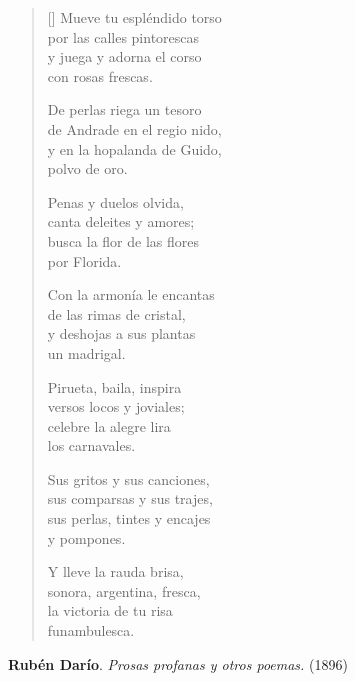 \begin{verse}[\versewidth]
Mueve tu espléndido torso \\
por las calles pintorescas \\
y juega y adorna el corso \\
con rosas frescas.

De perlas riega un tesoro \\
de Andrade en el regio nido, \\
y en la hopalanda de Guido, \\
polvo de oro.

Penas y duelos olvida, \\
canta deleites y amores; \\
busca la flor de las flores \\
por Florida.

Con la armonía le encantas \\
de las rimas de cristal, \\
y deshojas a sus plantas \\
un madrigal.

Pirueta, baila, inspira \\
versos locos y joviales; \\
celebre la alegre lira \\
los carnavales.

Sus gritos y sus canciones, \\
sus comparsas y sus trajes, \\
sus perlas, tintes y encajes \\
y pompones.

Y lleve la rauda brisa, \\
sonora, argentina, fresca, \\
la victoria de tu risa \\
funambulesca.
\end{verse}

\bigskip

\qquad\textbf{Rubén Darío}. \emph{Prosas profanas y otros poemas.} (1896)
